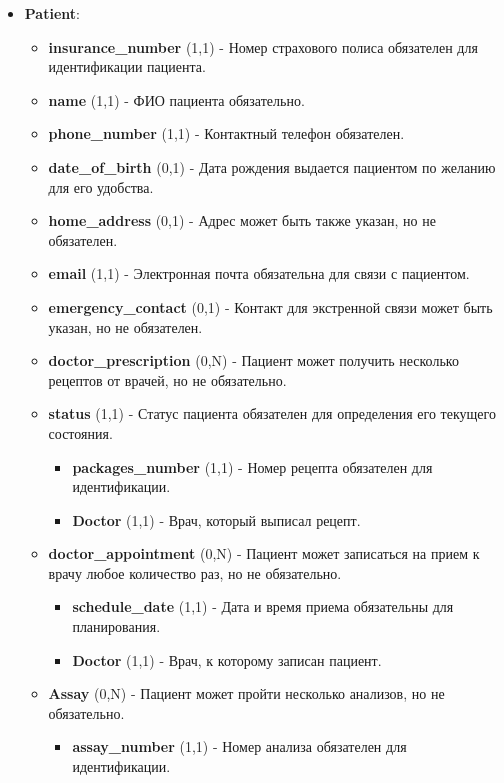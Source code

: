 \documentclass[a4paper, 14pt]{extarticle}
\begin{document}
\begin{itemize}
    \item \textbf{Patient}:
    \begin{itemize}
        \item \textbf{insurance\_number} (1,1) - Номер страхового полиса обязателен для идентификации пациента.
        \item \textbf{name} (1,1) - ФИО пациента обязательно.
        \item \textbf{phone\_number} (1,1) - Контактный телефон обязателен.
        \item \textbf{date\_of\_birth} (0,1) - Дата рождения выдается пациентом по желанию для его удобства.
        \item \textbf{home\_address} (0,1) - Адрес может быть также указан, но не обязателен.
        \item \textbf{email} (1,1) - Электронная почта обязательна для связи с пациентом.
        \item \textbf{emergency\_contact} (0,1) - Контакт для экстренной связи может быть указан, но не обязателен.
        \item \textbf{doctor\_prescription} (0,N) - Пациент может получить несколько рецептов от врачей, но не обязательно.
        \item \textbf{status} (1,1) - Статус пациента обязателен для определения его текущего состояния.
        \begin{itemize}
            \item \textbf{packages\_number} (1,1) - Номер рецепта обязателен для идентификации.
            \item \textbf{Doctor} (1,1) - Врач, который выписал рецепт.
        \end{itemize}
        \item \textbf{doctor\_appointment} (0,N) - Пациент может записаться на прием к врачу любое количество раз, но не обязательно.
        \begin{itemize}
            \item \textbf{schedule\_date} (1,1) - Дата и время приема обязательны для планирования.
            \item \textbf{Doctor} (1,1) - Врач, к которому записан пациент.
        \end{itemize}
        \item \textbf{Assay} (0,N) - Пациент может пройти несколько анализов, но не обязательно.
        \begin{itemize}
            \item \textbf{assay\_number} (1,1) - Номер анализа обязателен для идентификации.

\end{itemize}
\end{itemize}
\end{itemize}
\end{document}
